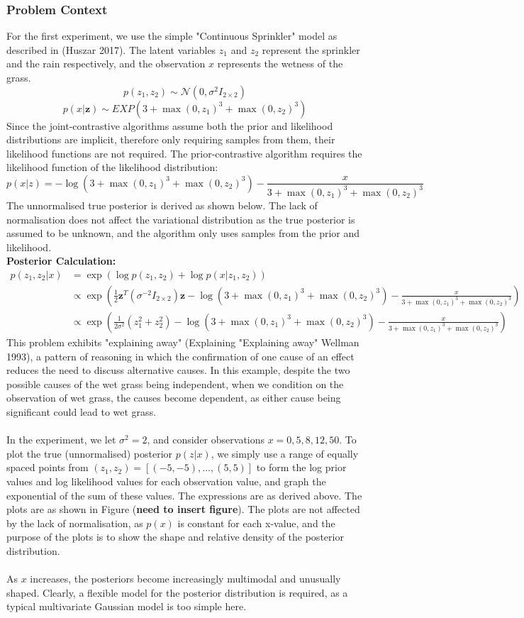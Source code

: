 \documentclass[a4paper,12pt]{article}
\newcommand{\N}{\mathcal{N}}
\numberwithin{equation}{section}
\begin{document}
\subsubsection{Problem Context}
For the first experiment, we use the simple "Continuous Sprinkler" model as described in (Huszar 2017). The latent variables $z_1$ and $z_2$ represent the sprinkler and the rain respectively, and the observation $x$ represents the wetness of the grass.
\[p(z_1,z_2)\sim \N (0,\sigma^2 I_{2\times 2})\]
\[p(x|\bm{z})\sim EXP(3+\max(0,z_1)^3+\max(0,z_2)^3)\]
Since the joint-contrastive algorithms assume both the prior and likelihood distributions are implicit, therefore only requiring samples from them, their likelihood functions are not required. The prior-contrastive algorithm requires the likelihood function of the likelihood distribution:
\[p(x|z)=-\log (3+\max (0,z_1)^3+\max(0,z_2)^3)-\frac{x}{3+\max (0,z_1)^3+\max(0,z_2)^3}\]
The unnormalised true posterior is derived as shown below. The lack of normalisation does not affect the variational distribution as the true posterior is assumed to be unknown, and the algorithm only uses samples from the prior and likelihood.\\
\textbf{Posterior Calculation:}
\begin{align*}
p(z_1,z_2|x)&= \exp(\log p(z_1,z_2)+\log p(x|z_1,z_2))\\
&\propto\exp\left(\frac12\bm{z}^T(\sigma^{-2}I_{2\times 2})\bm{z}-\log (3+\max(0,z_1)^3+\max(0,z_2)^3)-\frac{x}{3+\max(0,z_1)^3+\max(0,z_2)^3}\right)\\
&\propto \exp\left(\frac{1}{2\sigma^2}(z_1^2+z_2^2)-\log (3+\max(0,z_1)^3+\max(0,z_2)^3)-\frac{x}{3+\max(0,z_1)^3+\max(0,z_2)^3}\right)
\end{align*}
This problem exhibits "explaining away" (Explaining "Explaining away" Wellman 1993), a pattern of reasoning in which the confirmation of one cause of an effect reduces the need to discuss alternative causes. In this example, despite the two possible causes of the wet grass being independent, when we condition on the observation of wet grass, the causes become dependent, as either cause being significant could lead to wet grass.\\
\\
In the experiment, we let $\sigma^2=2$, and consider observations $x=0,5,8,12,50$. To plot the true (unnormalised) posterior $p(z|x)$, we simply use a range of equally spaced points from $(z_1,z_2)=[(-5,-5),\dots, (5,5)]$ to form the log prior values and log likelihood values for each observation value, and graph the exponential of the sum of these values. The expressions are as derived above. The plots are as shown in Figure (\textbf{need to insert figure}). The plots are not affected by the lack of normalisation, as $p(x)$ is constant for each x-value, and the purpose of the plots is to show the shape and relative density of the posterior distribution.\\
\\
As $x$ increases, the posteriors become increasingly multimodal and unusually shaped. Clearly, a flexible model for the posterior distribution is required, as a typical multivariate Gaussian model is too simple here.
\end{document}
